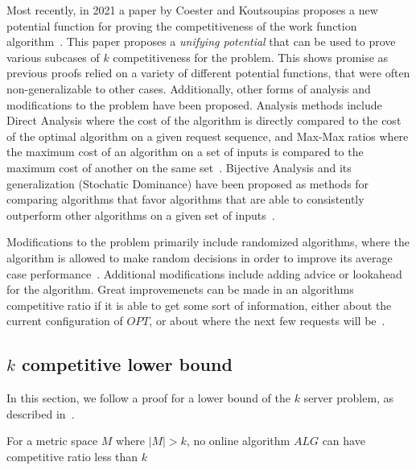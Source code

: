 Most recently, in 2021 a paper by Coester and Koutsoupias proposes a new potential function for proving the competitiveness of the work function algorithm~\cite{unifyingPotential2021}. This paper proposes a \textit{unifying potential} that can be used to prove various subcases of $k$ competitiveness for the \KS problem. This shows promise as previous proofs relied on a variety of different potential functions, that were often non-generalizable to other cases.
Additionally, other forms of analysis and modifications to the \KS problem have been proposed. Analysis methods include Direct Analysis where the cost of the algorithm is directly compared to the cost of the optimal algorithm on a given request sequence, and Max-Max ratios where the maximum cost of an algorithm on a set of inputs is compared to the maximum cost of another on the same set~\cite{MAXMAX2005}. Bijective Analysis and its generalization (Stochatic Dominance) have been proposed as methods for comparing algorithms that favor algorithms that are able to consistently outperform other algorithms on a given set of inputs~\cite{bij2016}. 

Modifications to the \KS problem primarily include randomized algorithms, where the algorithm is allowed to make random decisions in order to improve its average case performance~\cite{OnlineComp1998}. Additional modifications include adding advice or lookahead for the algorithm. Great improvemenets can be made in an algorithms competitive ratio if it is able to get some sort of information, either about the current configuration of $OPT$, or about where the next few requests will be~\cite{advice2015}.

\subsection{$k$ competitive lower bound}
\label{sec:lowerBound}

In this section, we follow a proof for a lower bound of the $k$ server problem, as described in~\cite{server2009}.

\begin{lemma}
    For a metric space $M$ where $|M| > k$, no online algorithm $ALG$ can have competitive ratio less than $k$
\end{lemma}

